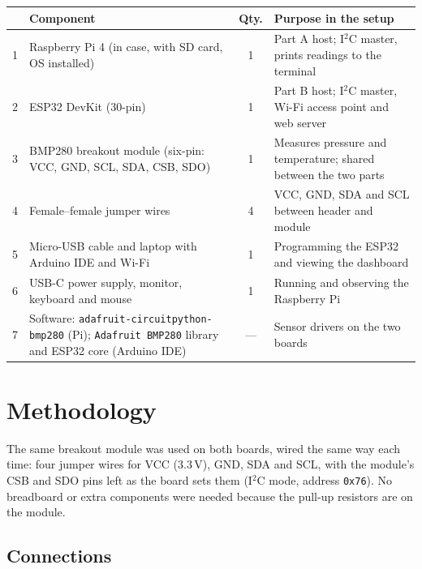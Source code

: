 \documentclass[10pt,a4paper]{article}
\begin{document}
\noindent
\begin{tabularx}{\textwidth}{@{}p{0.4cm} >{\raggedright\arraybackslash}p{5.6cm} c X@{}}
\toprule
\rowcolor{soft}
\multicolumn{1}{@{}l}{\textbf{\#}} & \textbf{Component} & \textbf{Qty.} & \textbf{Purpose in the setup} \\
\midrule
1 & Raspberry Pi 4 (in case, with SD card, OS installed) & 1 & Part A host; I$^2$C master, prints readings to the terminal \\
2 & ESP32 DevKit (30-pin)                                 & 1 & Part B host; I$^2$C master, Wi-Fi access point and web server \\
3 & BMP280 breakout module (six-pin: VCC, GND, SCL, SDA, CSB, SDO) & 1 & Measures pressure and temperature; shared between the two parts \\
4 & Female--female jumper wires                            & 4 & VCC, GND, SDA and SCL between header and module \\
5 & Micro-USB cable and laptop with Arduino IDE and Wi-Fi & 1 & Programming the ESP32 and viewing the dashboard \\
6 & USB-C power supply, monitor, keyboard and mouse        & 1 & Running and observing the Raspberry Pi \\
7 & Software: \texttt{adafruit-circuitpython-bmp280} (Pi); \texttt{Adafruit BMP280} library and ESP32 core (Arduino IDE) & --- & Sensor drivers on the two boards \\
\bottomrule
\end{tabularx}

\section{Methodology}

The same breakout module was used on both boards, wired the same way each time: four
jumper wires for VCC ($3.3\,\mathrm{V}$), GND, SDA and SCL, with the module's CSB and
SDO pins left as the board sets them (I$^2$C mode, address \texttt{0x76}). No
breadboard or extra components were needed because the pull-up resistors are on the
module.

\subsection{Connections}
\end{document}
